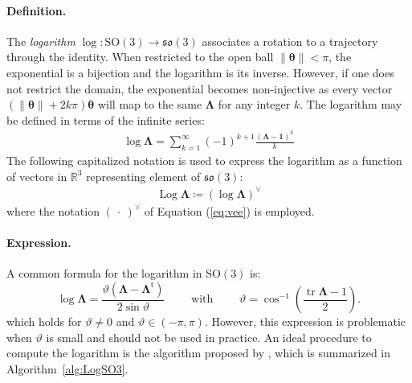 \paragraph*{Definition.}
The \emph{logarithm}
\(\log\colon\mathrm{SO}(3)\rightarrow\mathfrak{so}(3)\) associates a
rotation to a trajectory through the identity. When restricted to the open ball
\(\|\bm{\theta}\|<\pi\), the exponential is a bijection and the logarithm is
its inverse. However, if one does not restrict the domain, the
exponential becomes non-injective as every vector
\((\|\bm{\theta}\|+2 k \pi) \bm{\theta}\) will map to the same
\(\bm{\Lambda}\) for any integer \(k\).
The logarithm may be defined in terms of the infinite series:
\begin{equation*}
\begin{aligned}
\log \bm{\Lambda}=\sum_{k=1}^{\infty}(-1)^{k+1} \frac{(\bm{\Lambda}-\mathbf{1})^k}{k}
 \end{aligned}
\end{equation*}
The following capitalized notation
is used to express the logarithm as a function of vectors in
\(\mathbb{R}^3\) representing element of \(\mathfrak{so}(3)\):
\begin{equation*}
  \begin{aligned}
    \operatorname{Log}\bm{\Lambda} \coloneq \left(\log \bm{\Lambda}\right)^{\vee}
  \end{aligned}
\end{equation*}
where the notation \((~\cdot~)^{\vee}\) of Equation (\ref{eq:vee}) is employed.

\paragraph*{Expression.}

A common formula for the logarithm in \(\mathrm{SO}(3)\)  is: %
\begin{equation*} 
\log \bm{\Lambda}=\frac{\vartheta \left(\bm{\Lambda}-\bm{\Lambda}^{\mathrm{t}}\right)}{2 \sin \vartheta} 
\qquad\text { with }\qquad
 \vartheta=\cos ^{-1}\left(\frac{\operatorname{tr}\bm{\Lambda}-1}{2}\right) .
\end{equation*}
which holds for \(\vartheta \neq 0\) and \(\vartheta \in(-\pi, \pi)\).
However, this expression is problematic when \(\vartheta\) is small and should not be used in practice. 
An ideal 
 procedure to compute the logarithm is the algorithm proposed by  \cite{spurrier1978comment},
 which is summarized in Algorithm~\ref{alg:LogSO3}.

